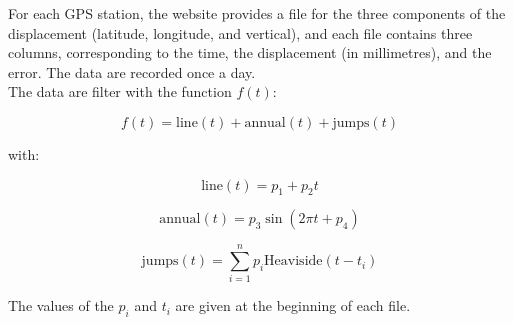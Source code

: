\documentclass[main.tex]{subfiles}
\begin{document}
For each GPS station, the website provides a file for the three components of the displacement (latitude, longitude, and vertical), and each file contains three columns, corresponding to the time, the displacement (in millimetres), and the error. The data are recorded once a day. \\

The data are filter with the function $f (t)$:

\begin{equation}
f (t) = \textrm{line} (t) + \textrm{annual} (t) + \textrm{jumps} (t)
\end{equation}

with:

\begin{equation}
\textrm{line} (t) = p_1 + p_2 t
\end{equation}

\begin{equation}
\textrm{annual} (t) = p_3 \sin (2 \pi t + p_4)
\end{equation}

\begin{equation}
\textrm{jumps} (t) = \sum_{i = 1}^{n} p_i \textrm{Heaviside} (t - t_i)
\end{equation}

The values of the $p_i$ and $t_i$ are given at the beginning of each file.
\end{document}
